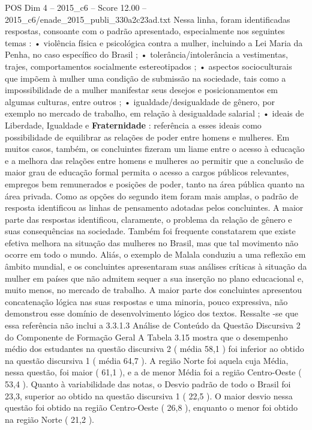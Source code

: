 \begin{textsample}{POS Dim 4 – 2015\_c6 – Score 12.00 – 2015\_c6/enade\_2015\_publi\_330a2c23ad.txt}
Nessa linha, foram identificadas respostas, consoante com o padrão apresentado, especialmente nos seguintes temas : • violência física e psicológica contra a mulher, incluindo a Lei Maria da Penha, no caso específico do Brasil ; • tolerância/intolerância a vestimentas, trajes, comportamentos socialmente estereotipados ; • aspectos socioculturais que impõem à mulher uma condição de submissão na sociedade, tais como a impossibilidade de a mulher manifestar seus desejos e posicionamentos em algumas culturas, entre outros ; • igualdade/desigualdade de gênero, por exemplo no mercado de trabalho, em relação à desigualdade salarial ; • ideais de Liberdade, Igualdade e \textbf{Fraternidade} : referência a esses ideais como possibilidade de equilibrar as relações de poder entre homens e mulheres.
Em muitos casos, também, os concluintes fizeram um liame entre o acesso à educação e a melhora das relações entre homens e mulheres ao permitir que a conclusão de maior grau de educação formal permita o acesso a cargos públicos relevantes, empregos bem remunerados e posições de poder, tanto na área pública quanto na área privada.
Como as opções do segundo item foram mais amplas, o padrão de resposta identificou as linhas de pensamento adotadas pelos concluintes.
A maior parte das respostas identificou, claramente, o problema da relação de gênero e suas consequências na sociedade.
Também foi frequente constatarem que existe efetiva melhora na situação das mulheres no Brasil, mas que tal movimento não ocorre em todo o mundo.
Aliás, o exemplo de Malala conduziu a uma reflexão em âmbito mundial, e os concluintes apresentaram suas análises críticas à situação da mulher em países que não admitem sequer a sua inserção no plano educacional e, muito menos, no mercado de trabalho.
A maior parte dos concluintes apresentou concatenação lógica nas suas respostas e uma minoria, pouco expressiva, não demonstrou esse domínio de desenvolvimento lógico dos textos.
Ressalte -se que essa referência não inclui a 3.3.1.3 Análise de Conteúdo da Questão Discursiva 2 do Componente de Formação Geral A Tabela 3.15 mostra que o desempenho médio dos estudantes na questão discursiva 2 ( média 58,1 ) foi inferior ao obtido na questão discursiva 1 ( média 64,7 ).
A região Norte foi aquela cuja Média, nessa questão, foi maior ( 61,1 ), e a de menor Média foi a região Centro-Oeste ( 53,4 ).
Quanto à variabilidade das notas, o Desvio padrão de todo o Brasil foi 23,3, superior ao obtido na questão discursiva 1 ( 22,5 ).
O maior desvio nessa questão foi obtido na região Centro-Oeste ( 26,8 ), enquanto o menor foi obtido na região Norte ( 21,2 ).

\end{textsample}
